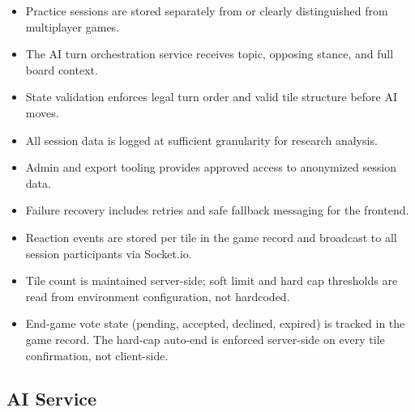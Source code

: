 \documentclass[11pt]{article}
\begin{document}
\begin{itemize}
  \item Practice sessions are stored separately from or clearly distinguished from multiplayer games.
  \item The AI turn orchestration service receives topic, opposing stance, and full board context.
  \item State validation enforces legal turn order and valid tile structure before AI moves.
  \item All session data is logged at sufficient granularity for research analysis.
  \item Admin and export tooling provides approved access to anonymized session data.
  \item Failure recovery includes retries and safe fallback messaging for the frontend.
  \item Reaction events are stored per tile in the game record and broadcast to all session
        participants via Socket.io.
  \item Tile count is maintained server-side; soft limit and hard cap thresholds are read from
        environment configuration, not hardcoded.
  \item End-game vote state (pending, accepted, declined, expired) is tracked in the game record.
        The hard-cap auto-end is enforced server-side on every tile confirmation, not client-side.
\end{itemize}

\subsection{AI Service}
\end{document}
